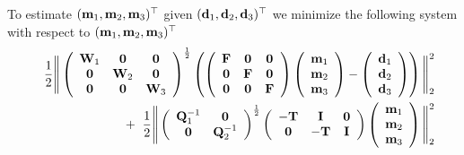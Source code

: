 \documentclass[11pt]{article}
\newcommand{\bfF}	{{\bf{F}}}
\newcommand{\bfI}	{{\bf{I}}}
\newcommand{\bfL}	{{\bf{L}}}
\newcommand{\bfQ}	{{\bf{Q}}}
\newcommand{\bfT}	{{\bf{T}}}
\newcommand{\bfW}	{{\bf{W}}}
\newcommand{\bfd}	{{\bf{d}}}
\newcommand{\bfm}	{{\bf{m}}}
\newcommand{\hf}        {{\frac 12}}
\newcommand {\zero}  { {\bf 0} }
\renewcommand{\hf}		 {\frac12}
\begin{document}
To estimate $(\bfm_1,\bfm_2,\bfm_3)^{\top}$ given $(\bfd_1,\bfd_2,\bfd_3)^{\top}$ we minimize the following system with respect to $(\bfm_1,\bfm_2,\bfm_3)^{\top}$
\begin{eqnarray}
\nonumber
&&\hf\Bigg\|
\left(\begin{array}{ccc}\bfW_1 & \zero & \zero \\ \zero & \bfW_2 & \zero \\ \zero & \zero & \bfW_3 \end{array}\right)^{\hf}	
\left(
\left(\begin{array}{ccc}\bfF & \zero & \zero \\   \zero & \bfF & \zero\\\zero & \zero& \bfF \end{array}\right)	
\left(\begin{array}{c}  \bfm_1  \\ \bfm_2 \\ \bfm_3\end{array}\right) -
\left(\begin{array}{c} \bfd_1   \\ \bfd_2 \\ \bfd_3\end{array}\right)
\right)\Bigg\|^2_2\\
 &&+ \;\;
\hf\Bigg\|
\left(\begin{array}{cc}\bfQ^{-1}_1 & \zero \\ \zero& \bfQ^{-1}_2 \end{array}\right)^{\hf}
\left( \begin{array}{ccc} -\bfT & \bfI & \zero  \\ \zero & -\bfT & \bfI \end{array}\right)
\left(\begin{array}{c}  \bfm_1  \\ \bfm_2 \\ \bfm_3 \end{array}\right)\Bigg\|^2_2
\end{eqnarray}
\end{document}
